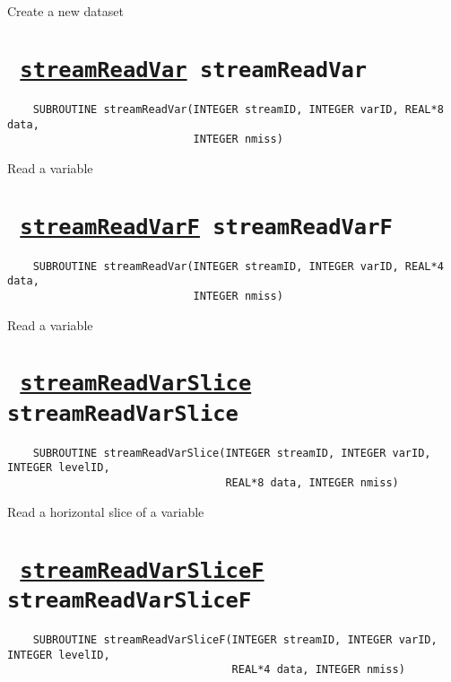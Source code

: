Create a new dataset
\ifpdfoutput{}{(\ref{streamOpenWrite})}


\section*{\texttt{ 
\ifpdf
\hyperref[streamReadVar]{streamReadVar}
\else
streamReadVar
\fi
}}
\begin{verbatim}
    SUBROUTINE streamReadVar(INTEGER streamID, INTEGER varID, REAL*8 data, 
                             INTEGER nmiss)
\end{verbatim}

Read a variable
\ifpdfoutput{}{(\ref{streamReadVar})}


\section*{\texttt{ 
\ifpdf
\hyperref[streamReadVarF]{streamReadVarF}
\else
streamReadVarF
\fi
}}
\begin{verbatim}
    SUBROUTINE streamReadVar(INTEGER streamID, INTEGER varID, REAL*4 data, 
                             INTEGER nmiss)
\end{verbatim}

Read a variable
\ifpdfoutput{}{(\ref{streamReadVarF})}


\section*{\texttt{ 
\ifpdf
\hyperref[streamReadVarSlice]{streamReadVarSlice}
\else
streamReadVarSlice
\fi
}}
\begin{verbatim}
    SUBROUTINE streamReadVarSlice(INTEGER streamID, INTEGER varID, INTEGER levelID, 
                                  REAL*8 data, INTEGER nmiss)
\end{verbatim}

Read a horizontal slice of a variable
\ifpdfoutput{}{(\ref{streamReadVarSlice})}


\section*{\texttt{ 
\ifpdf
\hyperref[streamReadVarSliceF]{streamReadVarSliceF}
\else
streamReadVarSliceF
\fi
}}
\begin{verbatim}
    SUBROUTINE streamReadVarSliceF(INTEGER streamID, INTEGER varID, INTEGER levelID, 
                                   REAL*4 data, INTEGER nmiss)
\end{verbatim}

